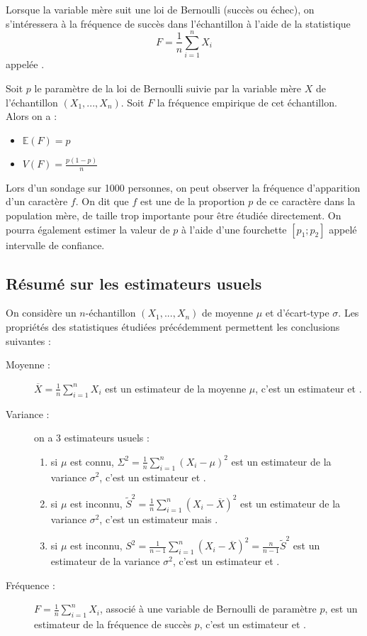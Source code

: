 Lorsque la variable mère suit une loi de Bernoulli (succès ou échec), on s'intéressera à la fréquence de succès dans l'échantillon à l'aide de la statistique 
$$F=\frac{1}{n}\sum_{i=1}^n X_i$$
appelée .

\begin{proposition}{}{}
  Soit $p$ le paramètre de la loi de Bernoulli suivie par la variable mère $X$ de l'échantillon $(X_1,...,X_n)$. Soit $F$ la fréquence empirique de cet échantillon. Alors on a :
 \begin{itemize}
  \item $\mathbb{E}(F)=p$
  \item $V(F) = \frac{p(1-p)}{n}$
 \end{itemize}
\end{proposition}




Lors d'un sondage sur 1000 personnes, on peut observer la fréquence d'apparition d'un caractère $f$. On dit que $f$ est une  de la proportion $p$ de ce caractère dans la population mère, de taille trop importante pour être étudiée directement. On pourra également estimer la valeur de $p$ à l'aide d'une fourchette $[p_1;p_2]$ appelé intervalle de confiance.

\subsection{Résumé sur les estimateurs usuels}
On considère un $n$-échantillon $(X_1,...,X_n)$ de moyenne $\mu$ et d'écart-type $\sigma$. Les propriétés des statistiques étudiées précédemment permettent les conclusions suivantes :

\begin{description}
 \item[Moyenne :] $\overline{X}=\frac{1}{n}\sum_{i=1}^n X_i$ est un estimateur de la moyenne $\mu$, c'est un estimateur  et .
 \item[Variance :] on a 3 estimateurs usuels :
 \begin{enumerate}
  \item si $\mu$ est connu, $\Sigma^2=\frac{1}{n}\sum_{i=1}^n (X_i-\mu)^2$ est un estimateur de la variance $\sigma^2$, c'est un estimateur  et .
  \item si $\mu$ est inconnu, $\tilde{S}^2=\frac{1}{n}\sum_{i=1}^n (X_i-\overline{X})^2$ est un estimateur de la variance $\sigma^2$, c'est un estimateur  mais .
  \item si $\mu$ est inconnu, $S^2=\frac{1}{n-1}\sum_{i=1}^n (X_i-\overline{X})^2 = \frac{n}{n-1}\tilde{S}^2$ est un estimateur de la variance $\sigma^2$, c'est un estimateur  et .
 \end{enumerate}
  \item[Fréquence :]  $F=\frac{1}{n}\sum_{i=1}^n X_i$, associé à une variable de Bernoulli de paramètre $p$, 
 est un estimateur de la fréquence de succès $p$, c'est un estimateur  et .
\end{description}

